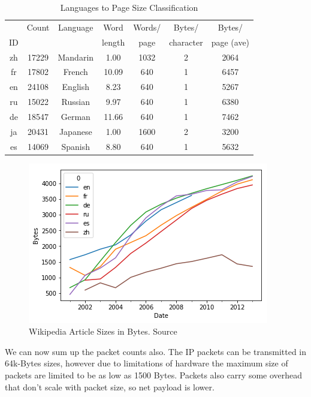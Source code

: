 \documentclass[conference]{IEEEtran}
\begin{document}
\begin{table}[htbp]
\caption{Languages to Page Size Classification}
\begin{center}
\begin{tabular}{|c|c|c|c|c|c|c|}
\hline
   &  Count &   Language &      Word &   Words/ &     Bytes/ &      Bytes/  \\
ID &        &            &    length &     page &  character &   page (ave) \\
\hline
zh &  17229 &   Mandarin &      1.00 &     1032 &          2 &         2064 \\
fr &  17802 &     French &     10.09 &      640 &          1 &         6457 \\
en &  24108 &    English &      8.23 &      640 &          1 &         5267 \\
ru &  15022 &    Russian &      9.97 &      640 &          1 &         6380 \\
de &  18547 &     German &     11.66 &      640 &          1 &         7462 \\
ja &  20431 &   Japanese &      1.00 &     1600 &          2 &         3200 \\
es &  14069 &    Spanish &      8.80 &      640 &          1 &         5632 \\
\hline
\end{tabular}
\label{bytes_page}
\end{center}
\end{table}

\begin{figure}[htbp]
\centering
\includegraphics[scale=.4]{art_size.png}
\caption{Wikipedia Article Sizes in Bytes. Source \cite{wiki_stats}}
\label{art_size}
\end{figure}

We can now sum up the packet counts also. The IP packets can be transmitted in 64k-Bytes sizes, however due to limitations of hardware the maximum size of packets are limited to be as low as 1500 Bytes\cite{Tanenbaum}. Packets also carry some overhead that don't scale with packet size, so net payload is lower. 
\end{document}
